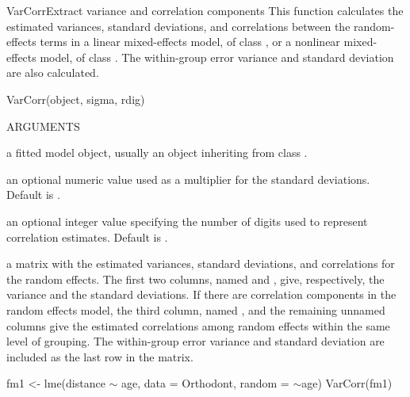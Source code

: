 \documentclass[pdftex]{article} \usepackage{url,graphicx}
\renewcommand{\Twiddle}{\mbox{\(\sim\)}}
\begin{document}
\begin{Helpfile}{VarCorr}{Extract variance and correlation components}
This function calculates the estimated variances, standard
deviations, and correlations between the random-effects terms in a
linear mixed-effects model, of class , or a nonlinear
mixed-effects model, of class . The within-group error
variance and standard deviation are also calculated.
\begin{Example}
VarCorr(object, sigma, rdig)
\end{Example}
\begin{Argument}{ARGUMENTS}
\item[\Co{object:}]
a fitted model object, usually an object inheriting from
class . 
\item[\Co{sigma:}]
an optional numeric value used as a multiplier for the
standard deviations. Default is .
\item[\Co{rdig:}]
an optional integer value specifying the number of digits
used to represent correlation estimates. Default is .
\end{Argument}
a matrix with the estimated variances, standard deviations, and
correlations for the random effects. The first two columns, named
 and , give, respectively, the variance
and the standard deviations. If there are correlation components in
the random effects model, the third column, named ,
and the remaining unnamed columns give the estimated correlations
among random effects within the same level of grouping. The
within-group error variance and standard deviation are included as
the last row in the matrix.
\need 15pt
\vspace{-16pt} 
\begin{Example}
fm1 <- lme(distance {\Twiddle} age, data = Orthodont, random = {\Twiddle}age)
VarCorr(fm1)
\end{Example}
\end{Helpfile}
\end{document}
